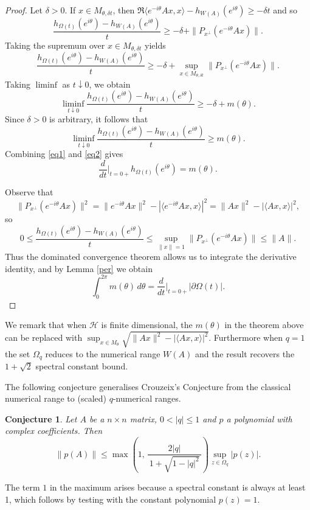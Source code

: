 \documentclass{article}
\newtheorem{Conjecture}[Theorem]{Conjecture}
\begin{document}
\begin{proof}
Let $\delta>0$. If $x\in M_{\theta,\delta t}$, then $
\Re\langle e^{-i\theta}Ax,x\rangle-h_{W(A)}(e^{i\theta})\ge -\delta t$ and so
\[
\frac{h_{\Omega(t)}(e^{i\theta})-h_{W(A)}(e^{i\theta})}{t}
\ge
-\delta+\|P_{x^\perp}(e^{-i\theta}Ax)\|.
\]
Taking the supremum over $x\in M_{\theta,\delta t}$ yields
\[
\frac{h_{\Omega(t)}(e^{i\theta})-h_{W(A)}(e^{i\theta})}{t}
\ge
-\delta+
\sup_{x\in M_{\theta,\delta t}}
\|P_{x^\perp}(e^{-i\theta}Ax)\|.
\]
Taking $\liminf$ as $t\downarrow0$, we obtain
\[
\liminf_{t\downarrow0}
\frac{h_{\Omega(t)}(e^{i\theta})-h_{W(A)}(e^{i\theta})}{t}
\ge
-\delta+m(\theta).
\]
Since $\delta>0$ is arbitrary, it follows that
\begin{equation}\label{eq2}
    \liminf_{t\downarrow0}
\frac{h_{\Omega(t)}(e^{i\theta})-h_{W(A)}(e^{i\theta})}{t}
\ge
m(\theta).
\end{equation}
Combining \eqref{eq1} and \eqref{eq2} gives
\[
\frac{d}{dt}\bigg|_{t=0+} h_{\Omega(t)}(e^{i\theta})=m(\theta).
\]

Observe that
\[
\|P_{x^\perp}(e^{-i\theta}Ax)\|^2
=
\|e^{-i\theta}Ax\|^2-|\langle e^{-i\theta}Ax,x\rangle|^2
=
\|Ax\|^2-|\langle Ax,x\rangle|^2,
\]
so
\[
0\le
\frac{h_{\Omega(t)}(e^{i\theta})-h_{W(A)}(e^{i\theta})}{t}
\le
\sup_{\|x\|=1}\|P_{x^\perp}(e^{-i\theta}Ax)\|
\le \|A\|.
\]
Thus the dominated convergence theorem allows us to integrate the derivative identity,
and by Lemma \ref{per} we obtain
\[
\int_0^{2\pi} m(\theta)\,d\theta
=
\frac{d}{dt}\bigg|_{t=0+} |\partial\Omega(t)|.
\]
\end{proof}
We remark that when $\mathcal{H}$ is finite dimensional, the $m(\theta)$ in the theorem above can be replaced with $\sup_{x\in M_\theta}\sqrt{\|Ax\|^2-|\langle Ax,x\rangle|^2}$. Furthermore when $q=1$ the set $\Omega_q$ reduces to the numerical range $W(A)$ and the
result recovers the $1+\sqrt{2}$ spectral constant bound.


The following conjecture generalises Crouzeix's Conjecture from the classical numerical range to (scaled) $q$-numerical ranges.

\begin{Conjecture}
    Let $A$ be a $n \times n$ matrix, $0 < |q| \leq 1$ and $p$ a polynomial with complex coefficients. Then 
    $$
    \|p(A)\| \leq \max\!\left( 1,\,
\frac{2|q|}{\,1+\sqrt{1-|q|^{2}}\,} \right) \sup_{z \in \Omega_q}|p(z)|.
    $$
\end{Conjecture}
The term $1$ in the maximum arises because a spectral constant is always at least 1, which follows by testing with the constant polynomial $p(z)=1$.





























\newpage



\end{document}
